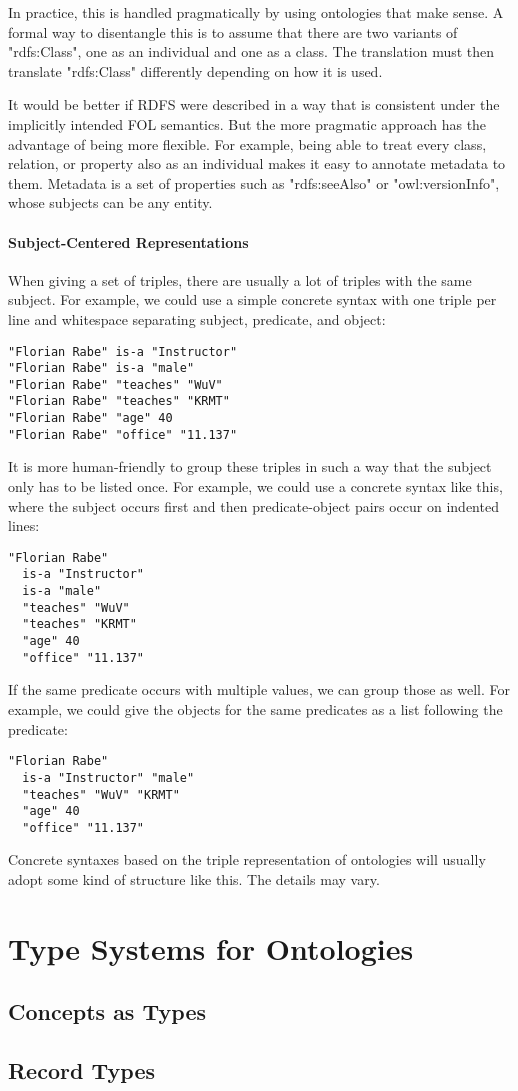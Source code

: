 In practice, this is handled pragmatically by using ontologies that make sense.
A formal way to disentangle this is to assume that there are two variants of "rdfs:Class", one as an individual and one as a class.
The translation must then translate "rdfs:Class" differently depending on how it is used.

It would be better if RDFS were described in a way that is consistent under the implicitly intended FOL semantics.
But the more pragmatic approach has the advantage of being more flexible.
For example, being able to treat every class, relation, or property also as an individual makes it easy to annotate metadata to them.
Metadata is a set of properties such as "rdfs:seeAlso" or "owl:versionInfo", whose subjects can be any entity.


\paragraph{Subject-Centered Representations}
When giving a set of triples, there are usually a lot of triples with the same subject.
For example, we could use a simple concrete syntax with one triple per line and whitespace separating subject, predicate, and object:
\begin{lstlisting}
"Florian Rabe" is-a "Instructor"
"Florian Rabe" is-a "male"
"Florian Rabe" "teaches" "WuV"
"Florian Rabe" "teaches" "KRMT"
"Florian Rabe" "age" 40
"Florian Rabe" "office" "11.137"
\end{lstlisting}

It is more human-friendly to group these triples in such a way that the subject only has to be listed once.
For example, we could use a concrete syntax like this, where the subject occurs first and then predicate-object pairs occur on indented lines:
\begin{lstlisting}
"Florian Rabe"
  is-a "Instructor"
  is-a "male"
  "teaches" "WuV"
  "teaches" "KRMT"
  "age" 40
  "office" "11.137"
\end{lstlisting}

If the same predicate occurs with multiple values, we can group those as well.
For example, we could give the objects for the same predicates as a list following the predicate:
\begin{lstlisting}
"Florian Rabe"
  is-a "Instructor" "male"
  "teaches" "WuV" "KRMT"
  "age" 40
  "office" "11.137"
\end{lstlisting}

Concrete syntaxes based on the triple representation of ontologies will usually adopt some kind of structure like this.
The details may vary.

\section{Type Systems for Ontologies}

\subsection{Concepts as Types}


\subsection{Record Types}